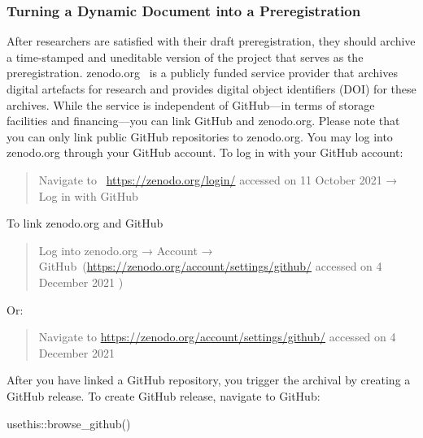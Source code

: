 \documentclass[psych,tutorial,accept,moreauthors,pdftex]{Definitions/mdpi}
\newenvironment{Shaded}{\begin{snugshade}}{\end{snugshade}}
\newcommand{\FunctionTok}[1]{\textcolor[rgb]{0.00,0.00,0.00}{#1}}
\newcommand{\NormalTok}[1]{#1}
\newcommand{\SpecialCharTok}[1]{\textcolor[rgb]{0.00,0.00,0.00}{#1}}
\begin{document}
\begin{paracol}{2}
\subsubsection*{Turning a Dynamic Document into a
Preregistration}\label{turning-a-dynamic-document-into-a-preregistration}

After researchers are satisfied with their draft preregistration, they
should archive a time-stamped and uneditable version of the project that
serves as the preregistration. zenodo.org~\citep{zenodo} is a publicly
funded service provider that archives digital artefacts for research and
provides digital object identifiers (DOI) for these archives. While the
service is independent of GitHub---in terms of storage facilities and
financing---you can link GitHub and zenodo.org. Please note that you can
only link public GitHub repositories to zenodo.org. You may log into
zenodo.org through your GitHub account. To log in with your GitHub
account:

\begin{quote}
{Navigate to}
~\url{https://zenodo.org/login/} accessed on 11 October 2021 → Log in with GitHub
\end{quote}

\noindent{}To link zenodo.org and GitHub

\begin{quote}
Log into zenodo.org → Account → {GitHub}~({\url{https://zenodo.org/account/settings/github/} accessed on 4 December 2021 })
\end{quote}

\noindent{}Or:

\begin{quote}
{Navigate to}
 \url{https://zenodo.org/account/settings/github/} accessed on 4 December 2021
\end{quote}

After you have linked a GitHub repository, you trigger the archival by
creating a GitHub release. To create GitHub release, navigate to GitHub:

\begin{adjustwidth}{0.5cm}{0cm} 
\begin{Shaded}
\begin{Highlighting}[]
\NormalTok{usethis}\SpecialCharTok{::}\FunctionTok{browse\_github}\NormalTok{()}
\end{Highlighting}
\end{Shaded}
\end{adjustwidth}


\end{paracol}
\end{document}
